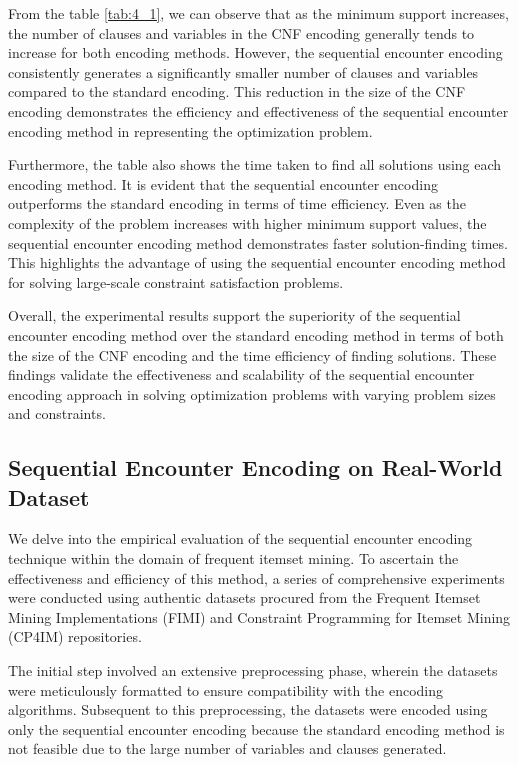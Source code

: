 From the table \ref{tab:4_1}, we can observe that as the minimum support increases,
the number of clauses and variables in the CNF encoding generally tends to increase for both encoding methods.
However, the sequential encounter encoding consistently generates a significantly smaller number of clauses and variables compared to the standard encoding.
This reduction in the size of the CNF encoding demonstrates the efficiency and effectiveness of the sequential encounter encoding method in representing the optimization problem.

Furthermore, the table also shows the time taken to find all solutions using each encoding method.
It is evident that the sequential encounter encoding outperforms the standard encoding in terms of time efficiency.
Even as the complexity of the problem increases with higher minimum support values, the sequential encounter encoding method demonstrates faster solution-finding times.
This highlights the advantage of using the sequential encounter encoding method for solving large-scale constraint satisfaction problems.

Overall, the experimental results support the superiority of the sequential encounter encoding method over the standard encoding method in terms of both the size of the CNF encoding and the time efficiency of finding solutions. These findings validate the effectiveness and scalability of the sequential encounter encoding approach in solving optimization problems with varying problem sizes and constraints.


\subsection{Sequential Encounter Encoding on Real-World Dataset}

We delve into the empirical evaluation of the sequential encounter encoding technique within the domain of frequent itemset mining. To ascertain the effectiveness and efficiency of this method, a series of comprehensive experiments were conducted using authentic datasets procured from the Frequent Itemset Mining Implementations (FIMI) and Constraint Programming for Itemset Mining (CP4IM) repositories.

The initial step involved an extensive preprocessing phase,
wherein the datasets were meticulously formatted to ensure compatibility with
the encoding algorithms. Subsequent to this preprocessing,
the datasets were encoded using only the sequential encounter encoding because the standard encoding method is not feasible due to the large number of variables and clauses generated.

